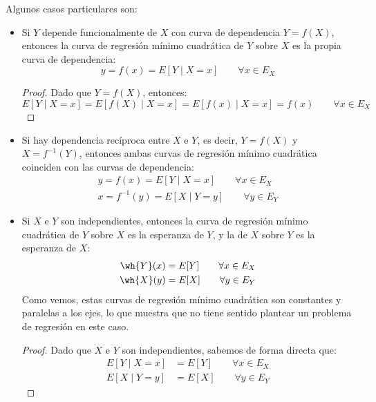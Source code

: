 Algunos casos particulares son:
\begin{itemize}
    \item Si $Y$ depende funcionalmente de $X$ con curva de dependencia $Y=f(X)$, entonces la curva de regresión mínimo cuadrática de $Y$ sobre $X$ es la propia curva de dependencia:
    \begin{equation*}
        y = f(x) = E[Y\mid X=x] \qquad \forall x\in E_X
    \end{equation*}
    \begin{proof}
        Dado que $Y=f(X)$, entonces:
        \begin{equation*}
            E[Y\mid X=x] = E[f(X)\mid X=x] = E[f(x)\mid X=x] = f(x)\qquad \forall x\in E_X
        \end{equation*}
    \end{proof}

    \item Si hay dependencia recíproca entre $X$ e $Y$, es decir, $Y=f(X)$ y $X=f^{-1}(Y)$, entonces ambas curvas de regresión mínimo cuadrática coinciden con las curvas de dependencia:
    \begin{align*}
        y = f(x) = E[Y\mid X=x] \qquad \forall x\in E_X\\
        x = f^{-1}(y) = E[X\mid Y=y] \qquad \forall y\in E_Y
    \end{align*}

    \item Si $X$ e $Y$ son independientes, entonces la curva de regresión mínimo cuadrática de $Y$ sobre $X$ es la esperanza de $Y$, y la de $X$ sobre $Y$ es la esperanza de $X$:
    \begin{align*}
        \wh{Y}(x) = E[Y] \qquad \forall x\in E_X\\
        \wh{X}(y) = E[X] \qquad \forall y\in E_Y
    \end{align*}
    Como vemos, estas curvas de regresión mínimo cuadrática son constantes y paralelas a los ejes, lo que muestra que no tiene sentido plantear un problema de regresión en este caso.
    \begin{proof}
        Dado que $X$ e $Y$ son independientes, sabemos de forma directa que:
        \begin{align*}
            E[Y\mid X=x] &= E[Y] \qquad \forall x\in E_X\\
            E[X\mid Y=y] &= E[X] \qquad \forall y\in E_Y
        \end{align*}
    \end{proof}
\end{itemize}

